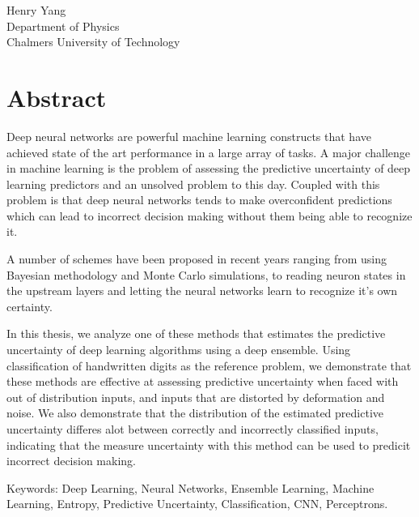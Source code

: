 Henry Yang\\
Department of Physics\\
Chalmers University of Technology \setlength{\parskip}{0.5cm}

\thispagestyle{plain}			%
\setlength{\parskip}{0pt plus 1.0pt}
\section*{Abstract}
\setlength{\parindent}{2em}
Deep neural networks are powerful machine learning constructs that have achieved state of the art performance in a large array of tasks. A major challenge in machine learning is the problem of assessing the predictive uncertainty of deep learning predictors and an unsolved problem to this day. Coupled with this problem is that deep neural networks tends to make overconfident predictions which can lead to incorrect decision making without them being able to recognize it. 

A number of schemes have been proposed in recent years ranging from using Bayesian methodology and Monte Carlo simulations, to reading neuron states in the upstream layers and letting the neural networks learn to recognize it's own certainty. 

In this thesis, we analyze one of these methods that estimates the predictive uncertainty of deep learning algorithms using a deep ensemble. Using classification of handwritten digits as the reference problem, we demonstrate that these methods are effective at assessing predictive uncertainty when faced with out of distribution inputs, and inputs that are distorted by deformation and noise. We also demonstrate that the distribution of the estimated predictive uncertainty differes alot between correctly and incorrectly classified inputs, indicating that the measure uncertainty with this method can be used to predicit incorrect decision making.

\vfill
Keywords: Deep Learning, Neural Networks, Ensemble Learning, Machine Learning, Entropy, Predictive Uncertainty, Classification, CNN, Perceptrons.

\newpage				%
\thispagestyle{empty}
\mbox{}